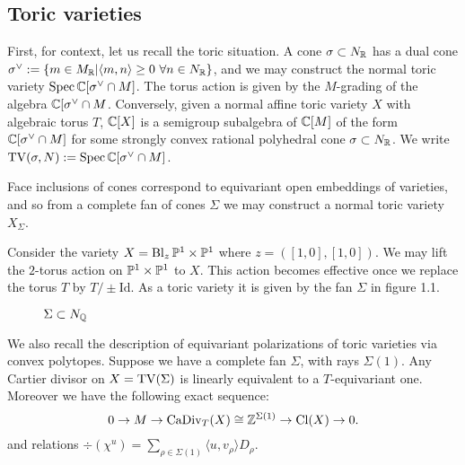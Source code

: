 \subsection{Toric varieties}
First, for context, let us recall the toric situation. A cone \(\sigma \subset N_{\mathbb{R}}\) has a dual cone \(\sigma^\vee := \{m \in M_{\mathbb{R}} | \langle m, n \rangle \ge 0 \ \forall n \in N_{\mathbb{R}}\}\), and we may construct the normal toric variety \(\operatorname{Spec} \mathbb{C}[\sigma^\vee \cap M]\). The torus action is given by the \(M\)-grading of the algebra \(\mathbb{C}[\sigma^\vee \cap M\).  Conversely, given a normal affine toric variety \(X\) with algebraic torus \(T\), \(\mathbb{C}[X]\) is a semigroup subalgebra of \(\mathbb{C}[M]\) of the form \(\mathbb{C}[\sigma^\vee \cap M]\) for some strongly convex rational polyhedral cone \(\sigma \subset N_{\mathbb{R}}\). We write \(\operatorname{TV}(\sigma,N):= \operatorname{Spec} \mathbb{C}[\sigma^\vee \cap M] \).

Face inclusions of cones correspond to equivariant open embeddings of varieties, and so from a complete fan of cones \(\Sigma\) we may construct a normal toric variety \(X_\Sigma\).
\begin{example}
Consider the variety \(X = \operatorname{Bl}_{z} \mathbb{P}^1 \times \mathbb{P}^1 \) where \(z = ( [1,0],[1,0]) \). We may lift the \(2\)-torus action on \(\mathbb{P}^1 \times \mathbb{P}^1 \) to \(X\). This action becomes effective once we replace the torus \(T\) by \(T/ \pm \text{Id}\). As a toric variety it is given by the fan \(\Sigma\) in figure 1.1.

\begin{figure}[h] \label{fig:toricfan}
\centering
	\caption{$\Sigma \subset N_{\mathbb{Q}}$}
\end{figure}
\end{example}
We also recall the description of equivariant polarizations of toric varieties via convex polytopes. Suppose we have a complete fan \(\Sigma\), with rays \(\Sigma(1)\). Any Cartier divisor on \(X = \operatorname{TV}(\Sigma)\) is linearly equivalent to a \(T\)-equivariant one. Moreover we have the following exact sequence:
\[
0 \to M \to \operatorname{CaDiv}_T(X) \cong \mathbb{Z}^{\Sigma(1)} \to \operatorname{Cl}(X) \to 0.
\]
and relations \(\div(\chi^u) = \sum_{\rho \in \Sigma(1)} \langle u, v_\rho \rangle D_\rho\).

